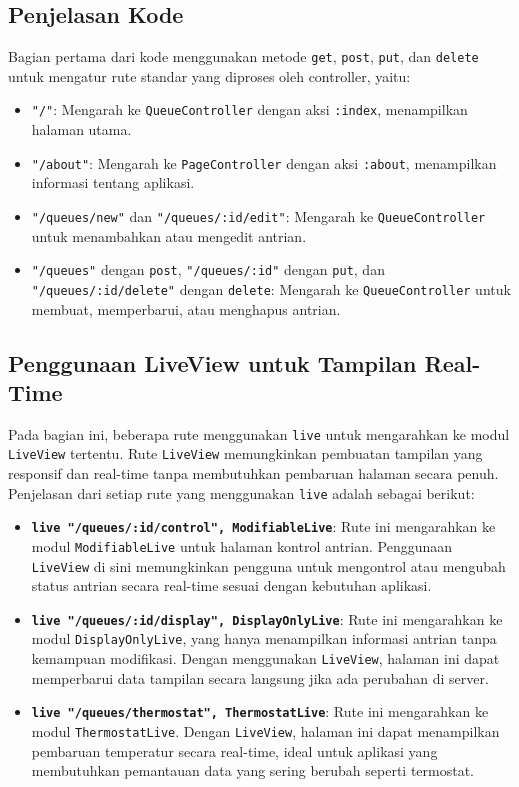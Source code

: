 \subsection{Penjelasan Kode}
Bagian pertama dari kode menggunakan metode \texttt{get}, \texttt{post}, \texttt{put}, dan \texttt{delete} untuk mengatur rute standar yang diproses oleh controller, yaitu:
\begin{itemize}
	\item \texttt{"/"}: Mengarah ke \texttt{QueueController} dengan aksi \texttt{:index}, menampilkan halaman utama.
	\item \texttt{"/about"}: Mengarah ke \texttt{PageController} dengan aksi \texttt{:about}, menampilkan informasi tentang aplikasi.
	\item \texttt{"/queues/new"} dan \texttt{"/queues/:id/edit"}: Mengarah ke \texttt{QueueController} untuk menambahkan atau mengedit antrian.
	\item \texttt{"/queues"} dengan \texttt{post}, \texttt{"/queues/:id"} dengan \texttt{put}, dan \texttt{"/queues/:id/delete"} dengan \texttt{delete}: Mengarah ke \texttt{QueueController} untuk membuat, memperbarui, atau menghapus antrian.
\end{itemize}

\subsection{Penggunaan LiveView untuk Tampilan Real-Time}
Pada bagian ini, beberapa rute menggunakan \texttt{live} untuk mengarahkan ke modul \texttt{LiveView} tertentu. Rute \texttt{LiveView} memungkinkan pembuatan tampilan yang responsif dan real-time tanpa membutuhkan pembaruan halaman secara penuh. Penjelasan dari setiap rute yang menggunakan \texttt{live} adalah sebagai berikut:

\begin{itemize}
	\item \textbf{\texttt{live "/queues/:id/control", ModifiableLive}}: Rute ini mengarahkan ke modul \texttt{ModifiableLive} untuk halaman kontrol antrian. Penggunaan \texttt{LiveView} di sini memungkinkan pengguna untuk mengontrol atau mengubah status antrian secara real-time sesuai dengan kebutuhan aplikasi.
	\item \textbf{\texttt{live "/queues/:id/display", DisplayOnlyLive}}: Rute ini mengarahkan ke modul \texttt{DisplayOnlyLive}, yang hanya menampilkan informasi antrian tanpa kemampuan modifikasi. Dengan menggunakan \texttt{LiveView}, halaman ini dapat memperbarui data tampilan secara langsung jika ada perubahan di server.
	\item \textbf{\texttt{live "/queues/thermostat", ThermostatLive}}: Rute ini mengarahkan ke modul \texttt{ThermostatLive}. Dengan \texttt{LiveView}, halaman ini dapat menampilkan pembaruan temperatur secara real-time, ideal untuk aplikasi yang membutuhkan pemantauan data yang sering berubah seperti termostat.
\end{itemize}

